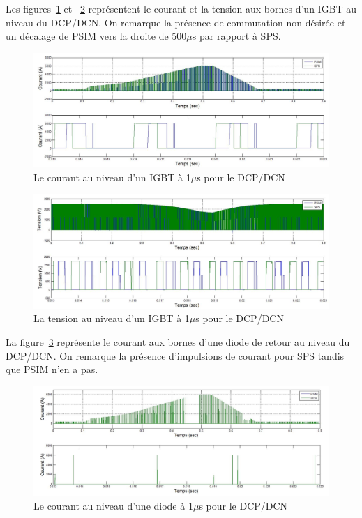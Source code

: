 \documentclass[11pt,letterpaper,final]{report}
\begin{document}
Les figures~\ref{AF_DC_HAA1} et ~\ref{AF_DC_HAV1} représentent le courant et la tension aux bornes d'un IGBT au niveau du DCP/DCN. On remarque la présence de commutation non désirée et un décalage de PSIM vers la droite de 500$\mu$s par rapport à SPS.

\begin{figure}[htb]
\centering
\includegraphics[scale=0.5]{Fig/DCP_AFE/1u/hash_cou_IGBT.jpg}
\caption{Le courant au niveau d'un IGBT à 1$\mu$s pour le DCP/DCN}
\label{AF_DC_HAA1}
\end{figure}



\begin{figure}[htb]
\centering
\includegraphics[scale=0.5]{Fig/DCP_AFE/1u/hash_ten_IGBT.jpg}
\caption{La tension au niveau d'un IGBT à 1$\mu$s pour le DCP/DCN}
\label{AF_DC_HAV1}
\end{figure}

La figure~\ref{AF_DC_HA1} représente le courant aux bornes d'une diode de retour au niveau du DCP/DCN. On remarque la présence d'impulsions de courant pour SPS tandis que PSIM n'en a pas.

\begin{figure}[htb]
\centering
\includegraphics[scale=0.5]{Fig/DCP_AFE/1u/hash_diode_cou.jpg}
\caption{Le courant au niveau d'une diode à 1$\mu$s pour le DCP/DCN}
\label{AF_DC_HA1}
\end{figure}
\end{document}
